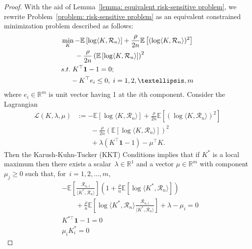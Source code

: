 \documentclass[10pt,a4paper]{amsart}
\begin{document}
\begin{proof}
  With the aid of Lemma~\ref{lemma: equivalent risk-sensitive problem},  we rewrite Problem~\eqref{problem: risk-sensitive problem} as an equivalent constrained minimization problem described as follows:
    \begin{align*}
        &\min_{K} -\mathbb{E}\left[ \log \langle K, \mathcal{R}_n \rangle \right] + \frac{\rho}{2n} \mathbb{E}\left[ (\log \langle K, \mathcal{R}_n \rangle )^2 \right] \\
        &\qquad   -\frac{\rho}{2n}\left( \mathbb{E}\left[ \log \langle K, \mathcal{R}_n \rangle \right]\right)^2 \\
        &{\rm s. t.} \; K^\top  \mathbf{1} - 1 = 0; \\
        &\;\;\;\;\; -K^\top  e_i \leq 0, \; i=1,2, \ldots, m
    \end{align*}
    where $ e_i \in \mathbb{R}^m $ is unit vector having 1 at the $i$th component. Consider the Lagrangian
    \begin{align*}
        \mathcal{L}(K, \lambda, \mu)
        &:= -\mathbb{E}\left[ \log \langle K, \mathcal{R}_n \rangle \right] + \frac{\rho}{2n} \mathbb{E} \left[ ( \log \langle K, \mathcal{R}_n \rangle)^2 \right] \\
        &\qquad -\frac{\rho}{2n}\left( \mathbb{E}\left[ \log \langle K, \mathcal{R}_n \rangle \right] \right)^2 \\ & \qquad + \lambda (K^\top  \mathbf{1} - 1) - \mu^\top K.
    \end{align*}
Then the Karush-Kuhn-Tucker (KKT) Conditions implies that if $K^*$ is a local maximum then there exists a scalar~$\lambda \in \mathbb{R}^1$ and a vector $\mu \in \mathbb{R}^m$ with component $\mu_j \geq 0$ such that, for~$i=1,2, \ldots, m$,
    \begin{align}
        &-\mathbb{E}\left[ \frac{\mathcal{R}_{n,i}}{ \langle K^{*}, \mathcal{R}_n \rangle} \right] \left( 1 + \frac{\rho}{n}\mathbb{E}\left[ \log \langle K^{*}, \mathcal{R}_n \rangle \right] \right) \nonumber \\
        &\qquad + \frac{\rho}{n}\mathbb{E}\left[ \log \langle K^{*}, \mathcal{R}_n \rangle \frac{\mathcal{R}_{n,i}}{\langle K^{*}, \mathcal{R}_n \rangle }  \right] +\lambda - \mu_i = 0 \label{eq:partial Ki (risk)} \\
        & K^{*\top} \mathbf{1} - 1 = 0 \label{eq: partical lambda (risk)} \\
        & \mu_i K_i^* = 0 \label{eq: Mu_i x Ki* = 0 (risk)}
    \end{align}

\end{proof}
\end{document}
